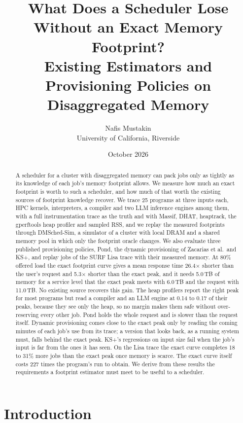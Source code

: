 \documentclass[11pt]{article}
\title{What Does a Scheduler Lose Without an Exact Memory Footprint?\\
Existing Estimators and Provisioning Policies on Disaggregated Memory}
\author{Nafis Mustakin\\University of California, Riverside}
\date{October 2026}
\begin{document}
\maketitle

\begin{abstract}
A scheduler for a cluster with disaggregated memory can pack jobs only as tightly as its knowledge of each job's
memory footprint allows. We measure how much an exact footprint is worth to such a scheduler, and how much of that
worth the existing sources of footprint knowledge recover. We trace 25 programs at three inputs each, HPC kernels,
interpreters, a compiler and two LLM inference engines among them, with a full instrumentation trace as the truth and
with Massif, DHAT, heaptrack, the gperftools heap profiler and sampled RSS, and we replay the measured footprints
through DMSched-Sim, a simulator of a cluster with local DRAM and a shared memory pool in which only the footprint
oracle changes. We also evaluate three published provisioning policies, Pond, the dynamic provisioning of Zacarias et
al.\ and KS+, and replay jobs of the SURF Lisa trace with their measured memory. At 80\% offered load the exact
footprint curve gives a mean response time 26.4$\times$ shorter than the user's request and 5.3$\times$ shorter than
the exact peak, and it needs 5.0\,TB of memory for a service level that the exact peak meets with 6.0\,TB and the
request with 11.0\,TB. No existing source recovers this gain. The heap profilers report the right peak for most
programs but read a compiler and an LLM engine at 0.14 to 0.17 of their peaks, because they see only the heap, so no
margin makes them safe without over-reserving every other job. Pond holds the whole request and is slower than the
request itself. Dynamic provisioning comes close to the exact peak only by reading the coming minutes of each job's
use from its trace; a version that looks back, as a running system must, falls behind the exact peak. KS+'s
regressions on input size fail when the job's input is far from the ones it has seen. On the Lisa trace the exact curve
completes 18 to 31\% more jobs than the exact peak once memory is scarce. The exact curve itself costs 227 times the
program's run to obtain. We derive from these results the requirements a footprint estimator must meet to be useful
to a scheduler.
\end{abstract}

\section{Introduction}
\label{sec:intro}
\end{document}
